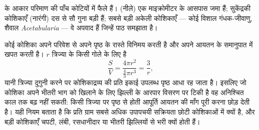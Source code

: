 \begin{omfigure}

{\small {} के आकार परिमाण की पाँच कोटियों में फैले हैं।
 (नीले) एक माइक्रोमीटर के आसपास जमा हैं; सुकेंद्रकी
कोशिकाएँ (नारंगी) दस से सौ गुना बड़ी हैं; सबसे बड़ी अकेली कोशिकाएँ ---
कोई विशाल गंधक-जीवाणु, शैवाल \emph{Acetabularia} --- वे अपवाद हैं जिन्हें
पाठ समझाता है।}
\end{omfigure}

\begin{proposition}[पृष्ठ, आयतन और आकार की सीमा]\label{prop:b2:unicellular-diversity:surface}
कोई कोशिका अपने परिवेश से अपने पृष्ठ के रास्ते विनिमय करती है और अपने
आयतन के समानुपात में खपत करती है। $r$ त्रिज्या के किसी गोले के लिए
\emph{} है
\[
\frac{S}{V} = \frac{4\pi r^2}{\tfrac{4}{3}\pi r^3} = \frac{3}{r},
\]
यानी त्रिज्या दुगुनी करने पर कोशिकाद्रव्य की प्रति इकाई उपलब्ध पृष्ठ आधा
रह जाता है। इसलिए जो कोशिका अपने भीतरी भाग को खिलाने के लिए झिल्ली के आरपार
विसरण पर टिकी है वह अनिश्चित काल तक बढ़ नहीं सकती: किसी त्रिज्या पर पृष्ठ
से होती आपूर्ति आयतन की माँग पूरी करना छोड़ देती है। यही नियम बताता है कि
प्रति ग्राम सबसे अधिक उपापचयी सक्रियता छोटी कोशिकाओं में क्यों है, और बड़ी
कोशिकाएँ चपटी, लंबी, रसधानीदार या भीतरी झिल्लियों से भरी क्यों होती हैं।
\end{proposition}

